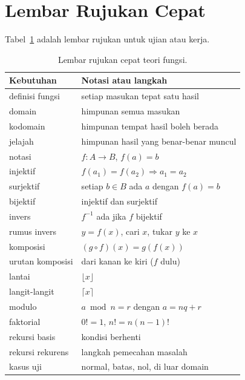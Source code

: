 \documentclass[11pt,a4paper]{article}
\begin{document}
\section{Lembar Rujukan Cepat}

Tabel~\ref{tab:rujukan-cepat} adalah lembar rujukan untuk ujian atau kerja.

\begin{table}[H]
	\centering
	\caption{Lembar rujukan cepat teori fungsi.}
	\label{tab:rujukan-cepat}
	\footnotesize
	\begin{tabularx}{\textwidth}{l X}
		\toprule
		Kebutuhan        & Notasi atau langkah                      \\
		\midrule
		definisi fungsi  & setiap masukan tepat satu hasil          \\
		domain           & himpunan semua masukan                   \\
		kodomain         & himpunan tempat hasil boleh berada       \\
		jelajah          & himpunan hasil yang benar-benar muncul   \\
		notasi           & $f:A \to B$, $f(a)=b$                    \\
		injektif         & $f(a_1)=f(a_2) \Rightarrow a_1=a_2$      \\
		surjektif        & setiap $b \in B$ ada $a$ dengan $f(a)=b$ \\
		bijektif         & injektif dan surjektif                   \\
		invers           & $f^{-1}$ ada jika $f$ bijektif           \\
		rumus invers     & $y=f(x)$, cari $x$, tukar $y$ ke $x$     \\
		komposisi        & $(g \circ f)(x)=g(f(x))$                 \\
		urutan komposisi & dari kanan ke kiri ($f$ dulu)            \\
		lantai           & $\lfloor x \rfloor$                      \\
		langit-langit    & $\lceil x \rceil$                        \\
		modulo           & $a \bmod n=r$ dengan $a=nq+r$            \\
		faktorial        & $0!=1$, $n!=n(n-1)!$                     \\
		rekursi basis    & kondisi berhenti                         \\
		rekursi rekurens & langkah pemecahan masalah                \\
		kasus uji        & normal, batas, nol, di luar domain       \\
		\bottomrule
	\end{tabularx}
\end{table}
\end{document}
